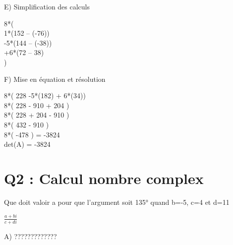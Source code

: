 E) Simplification des calculs

\vspace{5mm} %

8*(\\

  1*(152 – (-76))\\

  -5*(144 – (-38))\\

  +6*(72 – 38)\\

)

\vspace{10mm} %


F) Mise en équation et résolution \\

\vspace{5mm} %

8*( 228 -5*(182) + 6*(34))\\

8*( 228 - 910 + 204 )\\

8*( 228 + 204 - 910 )\\

8*( 432 - 910 )\\

8*( -478 ) = -3824\\

det(A) = -3824\\


\newpage

\section{Q2 : Calcul nombre complex}

\vspace{4mm} %

Que doit valoir a pour que l’argument soit 135° quand b=-5, c=4 et d=11 \\

\vspace{4mm} %

$
\frac{a+bi}{c+di}
$

\vspace{5mm} %

A) ?????????????

\newpage

\vspace{10mm} %


